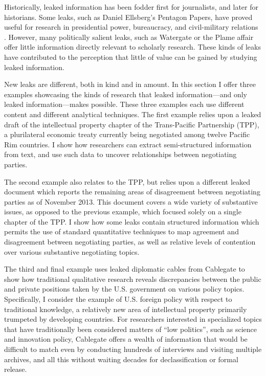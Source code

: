 \documentclass[12pt]{article}
\begin{document}
Historically, leaked information has been fodder first for journalists, and later for historians. 
Some leaks, such as Daniel Ellsberg's Pentagon Papers, have proved useful for research in 
presidential power, bureaucracy, and civil-military relations \citep{schwab2006clash,stevenson2006warriors}. However, many politically salient 
leaks, such as Watergate or the Plame affair offer little information directly relevant to scholarly research. 
These kinds of leaks have contributed to the perception that little of value can be gained by studying leaked information. 

New leaks are different, both in kind and in amount. In this section I offer three examples showcasing the kinds of research that 
leaked information---and only leaked information---makes possible. These three examples each use different content and different 
analytical techniques. The first example relies upon a leaked draft of the intellectual property 
chapter of the Trans-Pacific 
Partnership (TPP), a plurilateral economic treaty currently being negotiated among twelve Pacific Rim 
countries. I show how researchers can extract semi-structured information from text, and use such data 
to uncover relationships between negotiating parties.

The second example also relates to the TPP, but relies upon a different leaked document which reports  
the remaining areas of disagreement between negotiating parties as of November 2013. This document  
covers a wide variety of substantive issues, as opposed to the previous example, which focused solely 
on a single chapter of the TPP. I show how some leaks contain structured information which 
permits the use of standard quantitative techniques to map agreement and disagreement between negotiating 
parties, as well as relative levels of contention over various substantive negotiating topics. 

The third and final example uses leaked diplomatic cables from Cablegate to show how traditional
qualitative research reveals discrepancies between the 
public and private positions taken by the U.S. government on various policy topics. Specifically, I consider 
the example of U.S. foreign policy with respect to traditional knowledge, a relatively new area of intellectual 
property primarily trumpeted by developing countries. For researchers interested in specialized topics 
that have traditionally been considered matters of ``low politics'', such as science and innovation policy, 
Cablegate offers a wealth of information that would be difficult to match even by conducting hundreds of 
interviews and visiting multiple archives, and all this without waiting decades for declassification or formal release.
\end{document}
